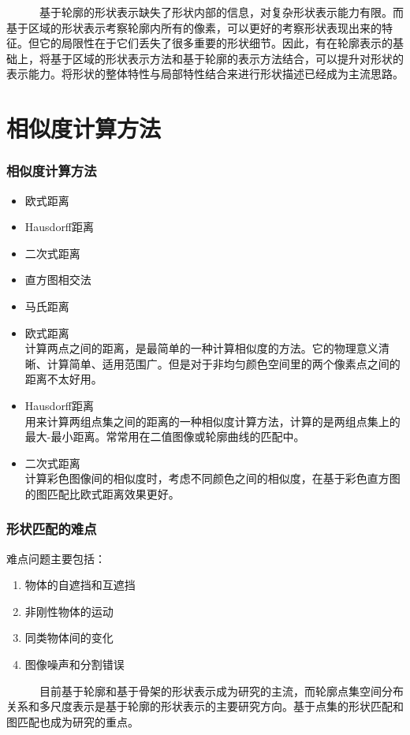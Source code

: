 \documentclass[notheorems,mathserif,table,compress]{beamer}  %
\begin{document}
\begin{frame}
  \begin{tcolorbox}[colback=red!5,colframe=blue!75!black]
~~~~~~基于轮廓的形状表示缺失了形状内部的信息，对复杂形状表示能力有限。而基于区域的形状表示考察轮廓内所有的像素，可以更好的考察形状表现出来的特征。但它的局限性在于它们丢失了很多重要的形状细节。因此，有在轮廓表示的基础上，将基于区域的形状表示方法和基于轮廓的表示方法结合，可以提升对形状的表示能力。将形状的整体特性与局部特性结合来进行形状描述已经成为主流思路。
  \end{tcolorbox}
\end{frame}



\section{相似度计算方法}   
 
\begin{frame}
\frametitle{相似度计算方法}
  \begin{itemize}
   \item 欧式距离
   \item Hausdorff距离
   \item 二次式距离
   \item 直方图相交法
   \item 马氏距离
  \end{itemize}
\end{frame}      

\begin{frame}
  \begin{itemize}
   \item 欧式距离\\
计算两点之间的距离，是最简单的一种计算相似度的方法。它的物理意义清晰、计算简单、适用范围广。但是对于非均匀颜色空间里的两个像素点之间的距离不太好用。\\
   \item Hausdorff距离\\
用来计算两组点集之间的距离的一种相似度计算方法，计算的是两组点集上的最大-最小距离。常常用在二值图像或轮廓曲线的匹配中。\\
   \item 二次式距离\\
计算彩色图像间的相似度时，考虑不同颜色之间的相似度，在基于彩色直方图的图匹配比欧式距离效果更好。\\
  \end{itemize}
\end{frame}

\begin{frame}
\frametitle{形状匹配的难点}
  难点问题主要包括：
  \begin{enumerate}
   \item 物体的自遮挡和互遮挡
   \item 非刚性物体的运动
   \item 同类物体间的变化
   \item 图像噪声和分割错误
  \end{enumerate}
\end{frame}

\begin{frame}
  \begin{tcolorbox}[colback=red!5,colframe=blue!75!black]
~~~~~~目前基于轮廓和基于骨架的形状表示成为研究的主流，而轮廓点集空间分布关系和多尺度表示是基于轮廓的形状表示的主要研究方向。基于点集的形状匹配和图匹配也成为研究的重点。
  \end{tcolorbox}
\end{frame}
\end{document}
